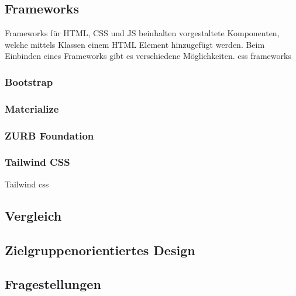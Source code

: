 	
	\cite{jump-start-sass}
	\subsection{Frameworks}
	Frameworks für HTML, CSS und JS beinhalten vorgestaltete Komponenten, welche mittels Klassen einem HTML Element hinzugefügt werden. Beim Einbinden eines Frameworks gibt es verschiedene Möglichkeiten.
	\Gls{css} \Gls{framework}s
		\subsubsection{Bootstrap}
		\subsubsection{Materialize}
		\subsubsection{ZURB Foundation}
		\subsubsection{Tailwind CSS}
		Tailwind \Gls{css}
	
	\subsection{Vergleich}
	
	\subsection{Zielgruppenorientiertes Design}
	\subsection{Fragestellungen}
